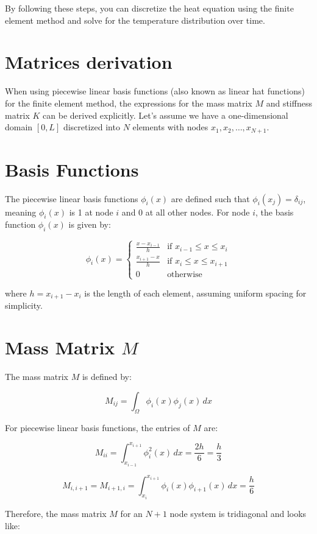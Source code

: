\documentclass{article}
\begin{document}
By following these steps, you can discretize the heat equation using the finite element method and solve for the temperature distribution over time.


\section*{Matrices derivation}

When using piecewise linear basis functions (also known as linear hat functions) for the finite element method, the expressions for the mass matrix \(M\) and stiffness matrix \(K\) can be derived explicitly. Let's assume we have a one-dimensional domain \([0, L]\) discretized into \(N\) elements with nodes \(x_1, x_2, \ldots, x_{N+1}\).

\section*{Basis Functions}
The piecewise linear basis functions \(\phi_i(x)\) are defined such that \(\phi_i(x_j) = \delta_{ij}\), meaning \(\phi_i(x)\) is 1 at node \(i\) and 0 at all other nodes. For node \(i\), the basis function \(\phi_i(x)\) is given by:

\[
\phi_i(x) = 
\begin{cases}
\frac{x - x_{i-1}}{h} & \text{if } x_{i-1} \leq x \leq x_i \\
\frac{x_{i+1} - x}{h} & \text{if } x_i \leq x \leq x_{i+1} \\
0 & \text{otherwise}
\end{cases}
\]

where \(h = x_{i+1} - x_i\) is the length of each element, assuming uniform spacing for simplicity.

\section*{Mass Matrix \(M\)}
The mass matrix \(M\) is defined by:

\[
M_{ij} = \int_{\Omega} \phi_i(x) \phi_j(x) \, dx
\]

For piecewise linear basis functions, the entries of \(M\) are:

\[
M_{ii} = \int_{x_{i-1}}^{x_{i+1}} \phi_i^2(x) \, dx = \frac{2h}{6} = \frac{h}{3}
\]

\[
M_{i,i+1} = M_{i+1,i} = \int_{x_i}^{x_{i+1}} \phi_i(x) \phi_{i+1}(x) \, dx = \frac{h}{6}
\]

Therefore, the mass matrix \(M\) for an \(N+1\) node system is tridiagonal and looks like:
\end{document}
